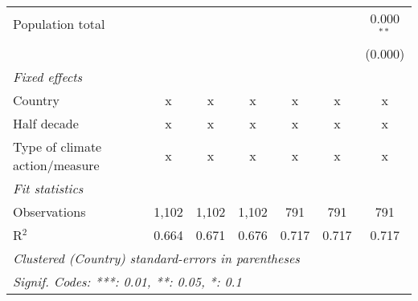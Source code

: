 \begin{tabular}{lcccccc}
   Population total                                             &               &                &                &                &                & 0.000$^{**}$\\   
                                                                &               &                &                &                &                & (0.000)\\   
   \emph{Fixed effects}\\
   Country                                                      & x             & x              & x              & x              & x              & x\\  
   Half decade                                                  & x             & x              & x              & x              & x              & x\\  
   Type of climate action/measure                               & x             & x              & x              & x              & x              & x\\  
   \midrule \emph{Fit statistics}\\
   Observations                                                 & 1,102         & 1,102          & 1,102          & 791            & 791            & 791\\  
   R$^2$                                                        & 0.664         & 0.671          & 0.676          & 0.717          & 0.717          & 0.717\\  
   \midrule
   \multicolumn{7}{l}{\emph{Clustered (Country) standard-errors in parentheses}}\\
   \multicolumn{7}{l}{\emph{Signif. Codes: ***: 0.01, **: 0.05, *: 0.1}}\\
\end{tabular}
\par\endgroup


